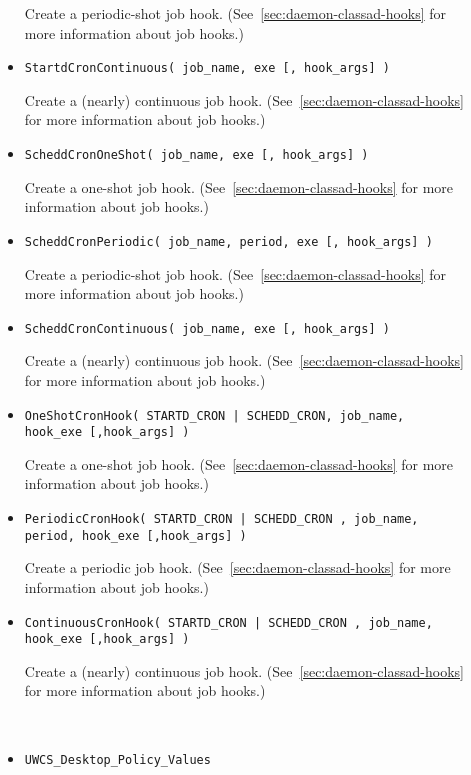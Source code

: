 \begin{description}
\begin{itemize}
	Create a periodic-shot  job hook.
	(See~\ref{sec:daemon-classad-hooks} for more information about job hooks.)

    \item \texttt{StartdCronContinuous( job\_name, exe [, hook\_args] )}

	Create a (nearly) continuous  job hook.
	(See~\ref{sec:daemon-classad-hooks} for more information about job hooks.)

    \item \texttt{ScheddCronOneShot( job\_name, exe [, hook\_args] )}

	Create a one-shot  job hook.
	(See~\ref{sec:daemon-classad-hooks} for more information about job hooks.)

    \item \texttt{ScheddCronPeriodic( job\_name, period, exe [, hook\_args] )}

	Create a periodic-shot  job hook.
	(See~\ref{sec:daemon-classad-hooks} for more information about job hooks.)

    \item \texttt{ScheddCronContinuous( job\_name, exe [, hook\_args] )}

	Create a (nearly) continuous  job hook.
	(See~\ref{sec:daemon-classad-hooks} for more information about job hooks.)

    \item \texttt{OneShotCronHook( STARTD\_CRON | SCHEDD\_CRON, job\_name,
	hook\_exe [,hook\_args] )}

	Create a one-shot job hook.
	(See~\ref{sec:daemon-classad-hooks} for more information about job hooks.)

    \item \texttt{PeriodicCronHook( STARTD\_CRON | SCHEDD\_CRON , job\_name,
	period, hook\_exe [,hook\_args] )}

	Create a periodic job hook.
	(See~\ref{sec:daemon-classad-hooks} for more information about job hooks.)

    \item \texttt{ContinuousCronHook( STARTD\_CRON | SCHEDD\_CRON ,
	job\_name, hook\_exe [,hook\_args] )}

	Create a (nearly) continuous job hook.
	(See~\ref{sec:daemon-classad-hooks} for more information about job hooks.)

\
    \item \texttt{UWCS\_Desktop\_Policy\_Values}


\end{itemize}
\end{description}
